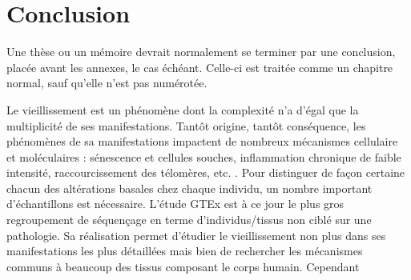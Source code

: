 \chapter*{Conclusion}         %

Une thèse ou un mémoire devrait normalement se terminer par une
conclusion, placée avant les annexes, le cas échéant. Celle-ci est
traitée comme un chapitre normal, sauf qu'elle n'est pas numérotée.




Le vieillissement est un phénomène dont la complexité n'a d'égal que la multiplicité de ses manifestations. Tantôt origine, tantôt conséquence, les phénomènes de sa manifestations impactent de nombreux mécanismes cellulaire et moléculaires : sénescence et cellules souches, inflammation chronique de faible intensité, raccourcissement des télomères, etc. \cite{Lopez-Otin2013}. Pour distinguer de façon certaine chacun des altérations basales chez chaque individu, un nombre important d'échantillons est nécessaire. L'étude GTEx est à ce jour le plus gros regroupement de séquençage en terme d'individus/tissus non ciblé sur une pathologie. Sa réalisation permet d'étudier le vieillissement non plus dans ses manifestations les plus détaillées mais bien de rechercher les mécanismes communs à beaucoup des tissus composant le corps humain. Cependant